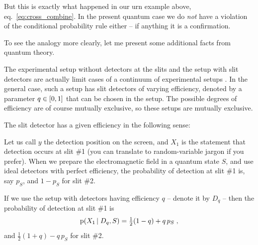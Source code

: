 \documentclass[\ifafour a4paper,12pt,\else a5paper,10pt,\fi%
onecolumn,oneside,article,%
british%
]{memoir}
\theoremstyle{remark}
\theoremstyle{innote}
\newcommand*{\citep}{\parencites}%
\DeclarePairedDelimiter\clcl{[}{]}
\newcommand*{\pf}{\mathrm{p}}%
\renewcommand*{\|}[1][]{\nonscript\,#1\vert\nonscript\;\mathopen{}}
\newcommand*{\eqn}{eq.}%
\newcommand*{\yxa}{X_{1}}
\newcommand*{\yxb}{X_{2}}
\newcommand*{\yDq}{D_{q}}
\begin{document}
But this is exactly what happened in our urn example above,
\eqn~\eqref{eq:cross_combine}. In the present quantum case we do \emph{not}
have a violation of the conditional probability rule either -- if anything
it is a confirmation.

To see the analogy more clearly, let me present some additional facts from
quantum theory.

\medskip

The experimental setup without detectors at the slits and the setup with
slit detectors are actually limit cases of a continuum of experimental
setups \citep{woottersetal1979}[for a recent review and further references
see][]{banaszeketal2013}. In the general case, such a setup has slit
detectors of varying efficiency, denoted by a parameter $q \in \clcl{0, 1}$
that can be chosen in the setup. The possible degrees of efficiency are of
course mutually exclusive, so these setups are mutually exclusive.

The slit detector has a given efficiency in the following sense:

Let us call $y$ the detection position on the screen, and $\yxa$ is the
statement that detection occurs at slit \#1 (you can translate to
random-variable jargon if you prefer). When we prepare the electromagnetic
field in a quantum state $S$, and use ideal detectors with perfect
efficiency, the probability of detection at slit \#1 is, say $p_{S}$, and
$1-p_{S}$ for slit \#2.


If we use the setup with detectors having efficiency $q$ -- denote it by
$\yDq$ -- then the probability of detection at slit \#1 is
\begin{equation}
  \label{eq:explain_noisy}
  \pf(\yxa \| \yDq, S) =  \tfrac{1}{2} (1-q) + q\,p_{S}\;,
\end{equation}
and $\tfrac{1}{2}(1+q) - q\,p_{S}$ for slit \#2.
\end{document}
